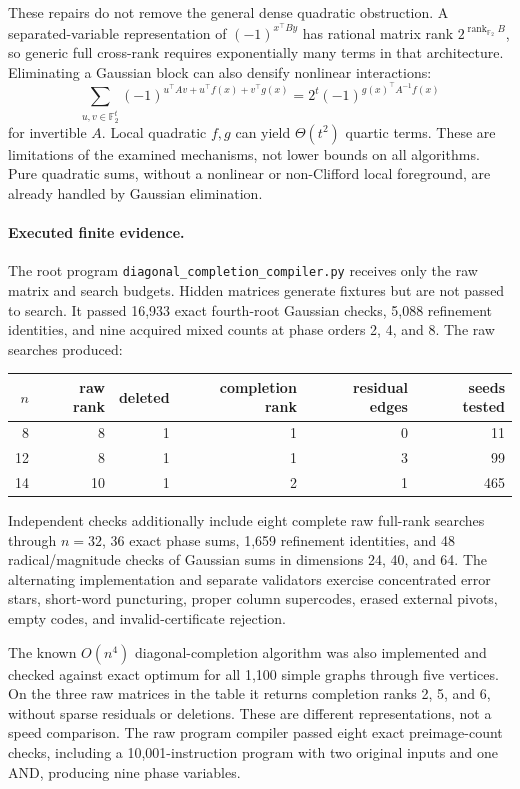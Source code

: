 \documentclass[11pt,a4paper]{article}
\theoremstyle{remark}\newtheorem{remark}[theorem]{Remark}
\newcommand{\F}{\mathbb F}\newcommand{\Z}{\mathbb Z}\newcommand{\Q}{\mathbb Q}
\newcommand{\rank}{\operatorname{rank}}\newcommand{\diag}{\operatorname{diag}}
\begin{document}
These repairs do not remove the general dense quadratic
obstruction. A separated-variable representation of
$(-1)^{x^\top By}$ has rational matrix rank
$2^{\rank_{\F_2} B}$, so generic full cross-rank requires
exponentially many terms in that architecture. Eliminating
a Gaussian block can also densify nonlinear interactions:
\[
\sum_{u,v\in\F_2^t}
(-1)^{u^\top Av+u^\top f(x)+v^\top g(x)}
=2^t(-1)^{g(x)^\top A^{-1}f(x)}
\]
for invertible $A$. Local quadratic $f,g$ can yield
$\Theta(t^2)$ quartic terms. These are limitations of the
examined mechanisms, not lower bounds on all algorithms.
Pure quadratic sums, without a nonlinear or non-Clifford
local foreground, are already handled by Gaussian elimination.

\paragraph{Executed finite evidence.}
The root program \texttt{diagonal\_completion\_compiler.py}
receives only the raw matrix and search budgets. Hidden
matrices generate fixtures but are not passed to search.
It passed 16,933 exact fourth-root Gaussian checks, 5,088
refinement identities, and nine acquired mixed counts at
phase orders 2, 4, and 8. The raw searches produced:
\begin{center}
\begin{tabular}{rrrrrr}
\toprule
$n$ & raw rank & deleted & completion rank & residual edges & seeds tested\\
\midrule
8 & 8 & 1 & 1 & 0 & 11\\
12 & 8 & 1 & 1 & 3 & 99\\
14 & 10 & 1 & 2 & 1 & 465\\
\bottomrule
\end{tabular}
\end{center}
Independent checks additionally include eight complete raw
full-rank searches through $n=32$, 36 exact phase sums,
1,659 refinement identities, and 48 radical/magnitude
checks of Gaussian sums in dimensions 24, 40, and 64.
The alternating implementation and separate validators
exercise concentrated error stars, short-word puncturing,
proper column supercodes, erased external pivots, empty codes,
and invalid-certificate rejection.

The known $O(n^4)$ diagonal-completion algorithm was also
implemented and checked against exact optimum for all 1,100
simple graphs through five vertices. On the three raw
matrices in the table it returns completion ranks 2, 5,
and 6, without sparse residuals or deletions. These are
different representations, not a speed comparison.
The raw program compiler passed eight exact preimage-count
checks, including a 10,001-instruction program with two
original inputs and one AND, producing nine phase variables.
\end{document}
